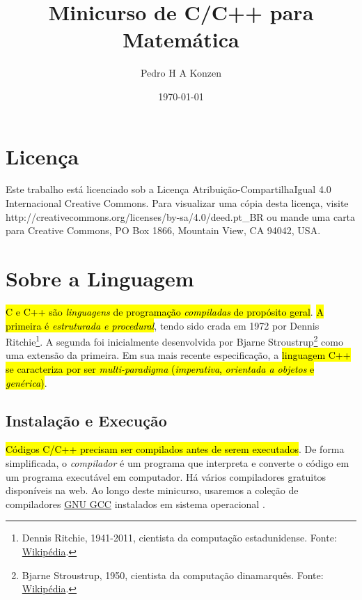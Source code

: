 \documentclass[12pt]{article}
\begin{document}
\title{Minicurso de C/C++ para Matemática}
\author{Pedro H A Konzen}
\date{\today}

\maketitle

\tableofcontents

\section{Licença}\label{sec_licenca}

Este trabalho está licenciado sob a Licença Atribuição-CompartilhaIgual 4.0 Internacional Creative Commons. Para visualizar uma cópia desta licença, visite http://creativecommons.org/licenses/by-sa/4.0/deed.pt\_BR ou mande uma carta para Creative Commons, PO Box 1866, Mountain View, CA 94042, USA.


\section{Sobre a Linguagem}\label{sec_sobrepy}

\hl{C e C++ são \emph{linguagens} de programação \emph{compiladas} de propósito geral}. \hl{A primeira é \emph{estruturada e procedural}}, tendo sido crada em 1972 por Dennis Ritchie\footnote{Dennis Ritchie, 1941-2011, cientista da computação estadunidense. Fonte: \href{https://pt.wikipedia.org/wiki/Dennis_Ritchie}{Wikipédia}.}. A segunda foi inicialmente desenvolvida por Bjarne Stroustrup\footnote{Bjarne Stroustrup, 1950, cientista da computação dinamarquês. Fonte: \href{https://pt.wikipedia.org/wiki/Bjarne_Stroustrup}{Wikipédia}.} como uma extensão da primeira. Em sua mais recente especificação, a \hl{linguagem C++ se caracteriza por ser \emph{multi-paradigma} (\emph{imperativa}, \emph{orientada a objetos} e \emph{genérica})}.

\subsection{Instalação e Execução}

\hl{Códigos C/C++ precisam ser compilados antes de serem executados}. De forma simplificada, o \emph{compilador} é um programa que interpreta e converte o código em um programa executável em computador. Há vários compiladores gratuitos disponíveis na web. Ao longo deste minicurso, usaremos a coleção de compiladores \href{https://gcc.gnu.org/}{GNU GCC} instalados em sistema operacional {\linux}.
\end{document}
